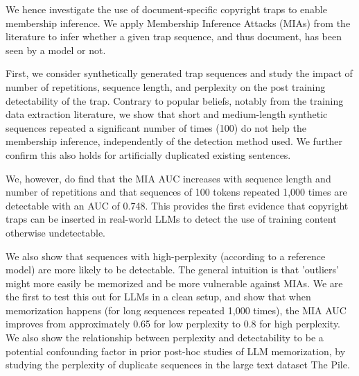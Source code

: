 We hence investigate the use of document-specific copyright traps to enable membership inference. We apply Membership Inference Attacks (MIAs) from the literature to infer whether a given trap sequence, and thus document, has been seen by a model or not.

First, we consider synthetically generated trap sequences and study the impact of number of repetitions, sequence length, and perplexity  on the post training detectability of the trap. Contrary to popular beliefs, notably from the training data extraction literature, we show that short and medium-length synthetic sequences repeated a significant number of times (100) do not help the membership inference, independently of the detection method used. We further confirm this also holds for artificially duplicated existing sentences. 

We, however, do find that the MIA AUC increases with sequence length and number of repetitions and that sequences of 100 tokens repeated 1,000 times are detectable with an AUC of 0.748. This provides the first evidence that copyright traps can be inserted in real-world LLMs to detect the use of training content otherwise undetectable.


We also show that sequences with high-perplexity (according to a reference model) are more likely to be detectable. The general intuition is that 'outliers' might more easily be memorized and be more vulnerable against MIAs. We are the first to test this out for LLMs in a clean setup, and show that when memorization happens (for long sequences repeated 1,000 times), the MIA AUC improves from approximately 0.65 for low perplexity to 0.8 for high perplexity. We also show the relationship between perplexity and detectability to be a potential confounding factor in prior post-hoc studies of LLM memorization, by studying the perplexity of duplicate sequences in the large text dataset The Pile.

